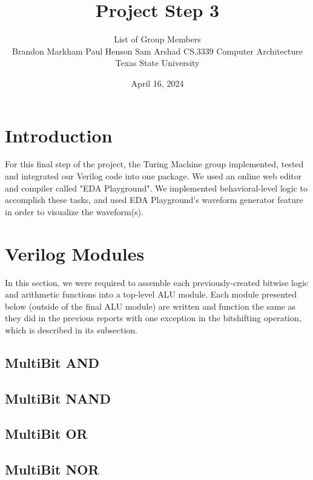 \documentclass[12pt]{article}
\title{Project Step 3}
\author{List of Group Members\\
\AND Brandon Markham
\AND Paul Henson
\AND Sam Arshad
\AND
\AND
	CS.3339 Computer Architecture\\
\AND
	Texas State University\\
}
\date{April 16, 2024}
\begin{document}
\maketitle

\newpage
\thispagestyle{empty}


\newpage
\setcounter{page}{1}
\section{Introduction}
For this final step of the project, the Turing Machine group implemented, tested and integrated our Verilog code into one package. We used an online web editor and compiler called "EDA Playground". We implemented behavioral-level logic to accomplish these tasks, and used EDA Playground's waveform generator feature in order to visualize the waveform(s).


\section{Verilog Modules}
\label{sec:headings}
In this section, we were required to assemble each previously-created bitwise logic and arithmetic functions into a top-level ALU module. Each module presented below (outside of the final ALU module) are written and function the same as they did in the previous reports with one exception in the bitshifting operation, which is described in its subsection.\newline\newline

\subsection{MultiBit AND}


\subsection{MultiBit NAND}


\subsection{MultiBit OR}


\subsection{MultiBit NOR}

\end{document}
